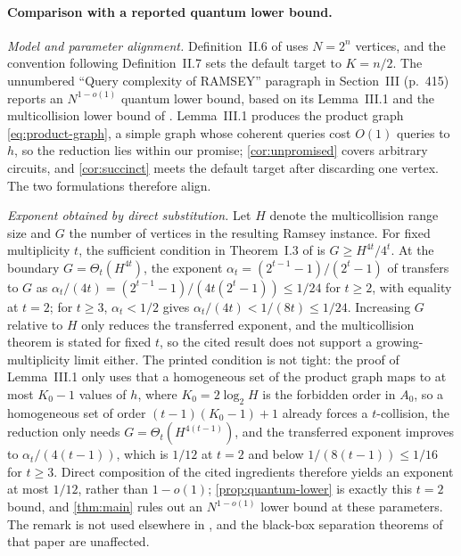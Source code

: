 \paragraph{Comparison with a reported quantum lower bound.}
\label{sec:jlrx}
\emph{Model and parameter alignment.}
Definition~II.6 of \cite{JainLiRobereXun2024} uses $N=2^n$ vertices, and the
convention following Definition~II.7 sets the default target to $K=n/2$.
The unnumbered ``Query complexity of RAMSEY'' paragraph in Section~III
(p.~415) reports an $N^{1-o(1)}$ quantum lower bound, based on its
Lemma~III.1 and the multicollision lower bound of \cite{LiuZhandry2019}.
Lemma~III.1 produces the product graph \cref{eq:product-graph}, a simple
graph whose coherent queries cost $O(1)$ queries to $h$, so the reduction
lies within our promise; \cref{cor:unpromised} covers arbitrary circuits,
and \cref{cor:succinct} meets the default target after discarding one
vertex.  The two formulations therefore align.

\emph{Exponent obtained by direct substitution.}
Let $H$ denote the multicollision range size and $G$ the number of vertices
in the resulting Ramsey instance.  For fixed multiplicity $t$, the
sufficient condition in Theorem~I.3 of \cite{JainLiRobereXun2024} is
$G\ge H^{4t}/4^t$.  At the boundary $G=\Theta_t(H^{4t})$, the exponent
$\alpha_t=(2^{t-1}-1)/(2^t-1)$ of \cite{LiuZhandry2019} transfers to $G$ as
$\alpha_t/(4t)=(2^{t-1}-1)/(4t(2^t-1))\le1/24$ for $t\ge2$, with equality
at $t=2$; for $t\ge3$, $\alpha_t<1/2$ gives $\alpha_t/(4t)<1/(8t)\le1/24$.  Increasing $G$ relative to $H$ only reduces
the transferred exponent, and the multicollision theorem is stated for
fixed $t$, so the cited result does not support a growing-multiplicity
limit either.  The printed condition is not tight: the proof of
Lemma~III.1 only uses that a homogeneous set of the product graph maps to
at most $K_0-1$ values of $h$, where $K_0=2\log_2H$ is the forbidden order
in $A_0$, so a homogeneous set of order $(t-1)(K_0-1)+1$ already forces a
$t$-collision, the reduction only needs $G=\Theta_t(H^{4(t-1)})$, and the
transferred exponent improves to $\alpha_t/(4(t-1))$, which is $1/12$ at
$t=2$ and below $1/(8(t-1))\le1/16$ for $t\ge3$.  Direct composition of
the cited ingredients therefore yields an exponent at most $1/12$, rather
than $1-o(1)$; \cref{prop:quantum-lower} is exactly this $t=2$ bound, and
\cref{thm:main} rules out an $N^{1-o(1)}$ lower bound at these parameters.
The remark is not used elsewhere in \cite{JainLiRobereXun2024}, and the
black-box separation theorems of that paper are unaffected.
